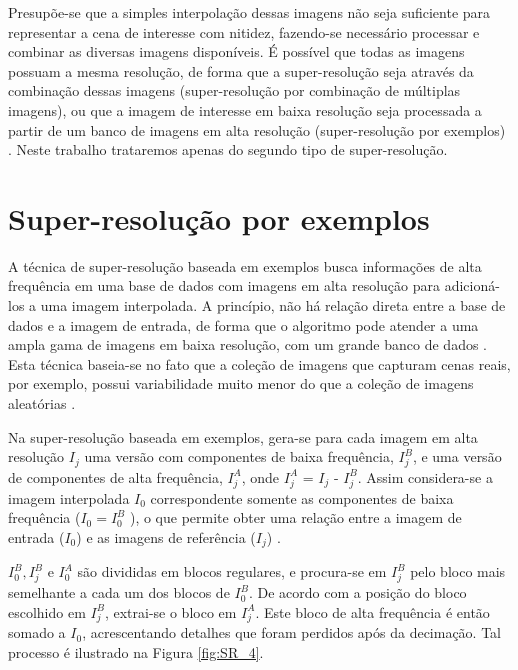     Presupõe-se que a simples interpolação dessas imagens não seja suficiente para representar a cena de interesse com nitidez, fazendo-se necessário processar e combinar as diversas imagens disponíveis. É possível que todas as imagens possuam a mesma resolução, de forma que a super-resolução seja através da combinação dessas imagens (super-resolução por combinação de múltiplas imagens), ou que a imagem de interesse em baixa resolução seja processada a partir de um banco de imagens em alta resolução (super-resolução por exemplos) \cite{garcia2013tecnicas}. Neste trabalho trataremos apenas do segundo tipo de super-resolução.


\section{Super-resolução por exemplos}
\label{SR_exemp}
A técnica de super-resolução baseada em exemplos busca informações de alta frequência em uma base de dados com imagens em alta resolução para adicioná-los a uma imagem interpolada. A princípio, não há relação direta entre a base de dados e a imagem de entrada, de forma que o algoritmo pode atender a uma ampla gama de imagens em baixa resolução, com um grande banco de dados \cite{freeman2002example}. Esta técnica baseia-se no fato que a coleção de imagens que capturam cenas reais, por exemplo, possui variabilidade muito menor do que a coleção de imagens aleatórias \cite{garcia2013tecnicas}.

Na super-resolução baseada em exemplos, gera-se para cada imagem em alta resolução $I_j$ uma versão com componentes de baixa frequência, $I_j^B$, e uma versão de componentes de alta frequência, $I_j^A$, onde $I_j^A$ = $I_j$ - $I_j^B$. Assim considera-se a imagem interpolada $I_0$ correspondente somente as componentes de baixa frequência ($I_0 = I_0^B$ ), o que permite obter uma relação entre a imagem de entrada ($I_0$) e as imagens de referência ($I_j$) \cite{garcia2013tecnicas}.

$I_0^B, I_j^B$ e $I_0^A$ são divididas em blocos regulares, e procura-se em $I^B_j$ pelo bloco mais semelhante a cada um dos blocos de $I_0^B$. De acordo com a posição do bloco escolhido em $I_j^B$, extrai-se o bloco em $I_j^A$. Este bloco de alta frequência é então somado a $I_0$, acrescentando detalhes que foram perdidos após da decimação. Tal processo é ilustrado na Figura \ref{fig:SR_4}.

